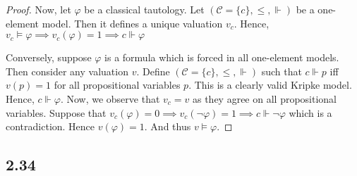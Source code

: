 \documentclass[12pt]{article}
\begin{document}
\begin{proof}
Now, let $\varphi$ be a classical tautology. Let $(\mathcal{C} = \{c\}, \leq, \Vdash)$ be a one-element model. Then it defines a unique valuation $v_c$. Hence, $v_c \vDash \varphi \implies v_c(\varphi) = 1 \implies c \Vdash \varphi$

Conversely, suppose $\varphi$ is a formula which is forced in all one-element models. Then consider any valuation $v$. Define $(\mathcal{C} = \{c\}, \leq, \Vdash)$ such that $c \Vdash p$ iff $v(p) = 1$ for all propositional variables $p$. This is a clearly valid Kripke model. Hence, $c \Vdash \varphi$. Now, we observe that $v_c = v$ as they agree on all propositional variables. Suppose that $v_c(\varphi) = 0 \implies v_c(\neg \varphi) = 1 \implies c \Vdash \neg \varphi$ which is a contradiction. Hence $v(\varphi) = 1$. And thus $v \vDash \varphi$.
\end{proof}

\subsection*{2.34}

\vspace{1in} %
\end{document}
